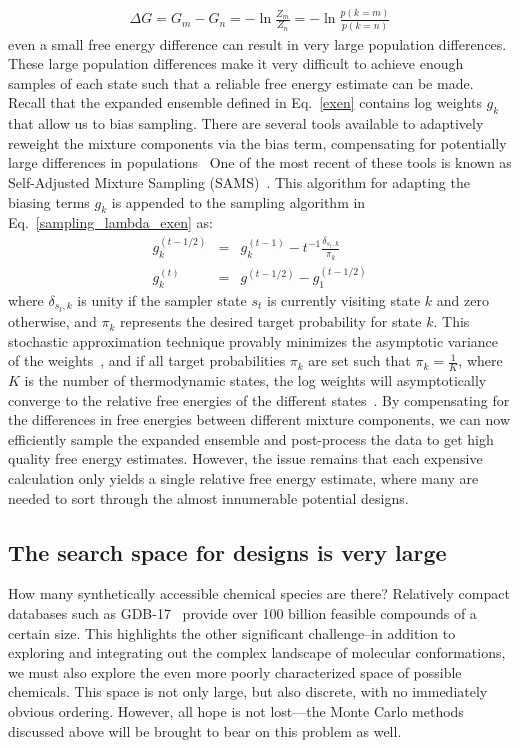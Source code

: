 %
\begin{eqnarray}
\Delta G = G_m - G_n = - \ln \frac{Z_m}{Z_n} = - \ln \frac{p(k = m)}{p(k = n)}
\end{eqnarray}
%
even a small free energy difference can result in very large population differences.
%
These large population differences make it very difficult to achieve enough samples of each state such that a reliable free energy estimate can be made.
%
Recall that the expanded ensemble defined in Eq.~\ref{exen} contains log weights $g_k$ that allow us to bias sampling.
%
There are several tools available to adaptively reweight the mixture components via the bias term, compensating for potentially large differences in populations~\cite{Liang2007,Wang2001,Tan2017}
%
One of the most recent of these tools is known as Self-Adjusted Mixture Sampling (SAMS)~\cite{Tan2017}.
%
This algorithm for adapting the biasing terms $g_k$ is appended to the sampling algorithm in Eq.~\ref{sampling_lambda_exen} as:
%
\begin{eqnarray} \label{binary-sams}
     g^{(t-1/2)}_k &=& g^{(t-1)}_k - t^{-1} \frac{\delta_{s_t, k}}{\pi_k} \\
     g^{(t)}_k &=& g^{(t-1/2)} - g^{(t-1/2)}_1
\end{eqnarray}
%
where $\delta_{s_t, k}$ is unity if the sampler state $s_t$ is currently visiting state $k$ and zero otherwise, and $\pi_k$ represents the desired target probability for state $k$.
%
This stochastic approximation technique provably minimizes the asymptotic variance of the weights~\cite{Tan2017}, and if all target probabilities $\pi_k$ are set such that $\pi_k = \frac{1}{K}$, where $K$ is the number of thermodynamic states, the log weights will asymptotically converge to the relative free energies of the different states~\cite{Tan2017}.
%
By compensating for the differences in free energies between different mixture components, we can now efficiently sample the expanded ensemble and post-process the data to get high quality free energy estimates.
%
However, the issue remains that each expensive calculation only yields a single relative free energy estimate, where many are needed to sort through the almost innumerable potential designs.
%
\subsection{The search space for designs is very large}
How many synthetically accessible chemical species are there?
%
Relatively compact databases such as GDB-17~\cite{Ruddigkeit2012} provide over 100 billion feasible compounds of a certain size.
%
This highlights the other significant challenge--in addition to exploring and integrating out the complex landscape of molecular conformations, we must also explore the even more poorly characterized space of possible chemicals.
%
This space is not only large, but also discrete, with no immediately obvious ordering.
%
However, all hope is not lost---the Monte Carlo methods discussed above will be brought to bear on this problem as well.
%
